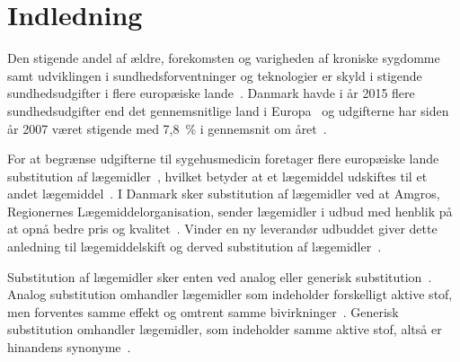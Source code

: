 \chapter{Indledning}
Den stigende andel af ældre, forekomsten og varigheden af kroniske sygdomme samt udviklingen i sundhedsforventninger og teknologier er skyld i stigende sundhedsudgifter i flere europæiske lande~\citep{Ess2003}. Danmark havde i år 2015 flere sundhedsudgifter end det gennemsnitlige land i Europa~\citep{EU2017} og udgifterne har siden år 2007 været stigende med 7,8~\% i gennemsnit om året~\citep{Sundhed2016}.

For at begrænse udgifterne til sygehusmedicin foretager flere europæiske lande substitution af lægemidler~\citep{Ess2003,Johnston2011}, hvilket betyder at et lægemiddel udskiftes til et andet lægemiddel~\citep{DanskSelskabforPatientsikkerhed2009, Kairi2017}.  I Danmark sker substitution af lægemidler ved at Amgros, Regionernes Lægemiddelorganisation, sender lægemidler i udbud med henblik på at opnå bedre pris og kvalitet~\citep{Amgros2015}. %
Vinder en ny leverandør udbuddet giver dette anledning til lægemiddelskift og derved substitution af lægemidler~\citep{Amgros2015}. %


Substitution af lægemidler sker enten ved analog eller generisk substitution~\citep{DanskSelskabforPatientsikkerhed2009}.  
Analog substitution omhandler lægemidler som indeholder forskelligt aktive stof, men forventes samme effekt og omtrent samme bivirkninger~\citep{DanskSelskabforPatientsikkerhed2009,Kairi2017}. 
Generisk substitution omhandler lægemidler, som indeholder samme aktive stof, altså er hinandens synonyme~\citep{DanskSelskabforPatientsikkerhed2009,Kairi2017}. 

